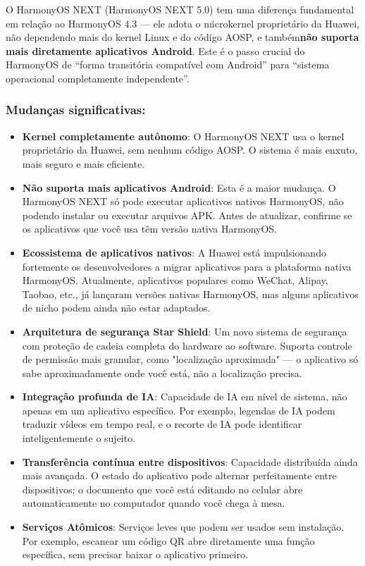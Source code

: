 
O HarmonyOS NEXT (HarmonyOS NEXT 5.0) tem uma diferença fundamental em relação ao HarmonyOS 4.3 — ele adota o microkernel proprietário da Huawei, não dependendo mais do kernel Linux e do código AOSP, e também\textbf{não suporta mais diretamente aplicativos Android}. Este é o passo crucial do HarmonyOS de “forma transitória compatível com Android” para “sistema operacional completamente independente”.

\subsubsection*{Mudanças significativas:}

\begin{itemize}
  \item \textbf{Kernel completamente autônomo}: O HarmonyOS NEXT usa o kernel proprietário da Huawei, sem nenhum código AOSP. O sistema é mais enxuto, mais seguro e mais eficiente.
  \item \textbf{Não suporta mais aplicativos Android}: Esta é a maior mudança. O HarmonyOS NEXT só pode executar aplicativos nativos HarmonyOS, não podendo instalar ou executar arquivos APK. Antes de atualizar, confirme se os aplicativos que você usa têm versão nativa HarmonyOS.
  \item \textbf{Ecossistema de aplicativos nativos}: A Huawei está impulsionando fortemente os desenvolvedores a migrar aplicativos para a plataforma nativa HarmonyOS. Atualmente, aplicativos populares como WeChat, Alipay, Taobao, etc., já lançaram versões nativas HarmonyOS, mas alguns aplicativos de nicho podem ainda não estar adaptados.
  \item \textbf{Arquitetura de segurança Star Shield}: Um novo sistema de segurança com proteção de cadeia completa do hardware ao software. Suporta controle de permissão mais granular, como "localização aproximada" — o aplicativo só sabe aproximadamente onde você está, não a localização precisa.
  \item \textbf{Integração profunda de IA}: Capacidade de IA em nível de sistema, não apenas em um aplicativo específico. Por exemplo, legendas de IA podem traduzir vídeos em tempo real, e o recorte de IA pode identificar inteligentemente o sujeito.
  \item \textbf{Transferência contínua entre dispositivos}: Capacidade distribuída ainda mais avançada. O estado do aplicativo pode alternar perfeitamente entre dispositivos; o documento que você está editando no celular abre automaticamente no computador quando você chega à mesa.
  \item \textbf{Serviços Atômicos}: Serviços leves que podem ser usados sem instalação. Por exemplo, escanear um código QR abre diretamente uma função específica, sem precisar baixar o aplicativo primeiro.
\end{itemize}

